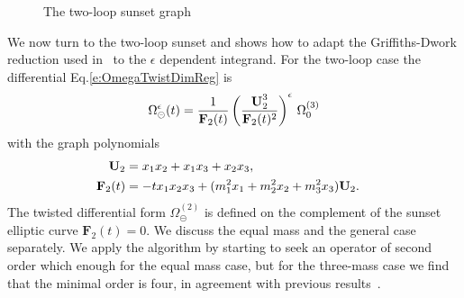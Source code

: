 \documentclass[a4paper,12pt]{article}
\numberwithin{equation}{section}
\numberwithin{figure}{section}
\def\su{\circleddash}
\begin{document}
%
\begin{figure}[ht]
  \centering
  \caption{The two-loop sunset graph}
  \label{fig:sunset2loop}
\end{figure}

We now turn to the two-loop sunset and shows how to adapt the
Griffiths-Dwork reduction used in~\cite{Bloch:2016izu,Lairez:2022zkj} to the $\epsilon$
dependent integrand. For the two-loop case the differential Eq.\eqref{e:OmegaTwistDimReg} is
\begin{equation}\label{e:OmegaSunset}
  \Omega_{\su}^{\epsilon}(t)={1\over
    \textbf{F}_2(t)}\left(\textbf{U}_2^3\over \textbf{F}_2(t)^2\right)^\epsilon  \,\Omega_0^{(3)}
\end{equation}
with the graph polynomials
\begin{align}
 \textbf{U}_2&=x_1x_2+x_1x_3+x_2x_3,\cr
  \textbf{F}_2(t)&=-tx_1x_2x_3 + (m_1^2x_1+m_2^2x_2+m_3^2x_3) \textbf{U}_2.
\end{align}
%
The twisted differential form $\Omega_\su^{(2)}$ is defined on the
complement of the sunset elliptic curve $\mathbf{F}_2(t)=0$.
%
We discuss the equal mass and the general case separately.
We apply the algorithm by starting to seek an operator of second order which enough for the equal mass case, but for the
three-mass case we find that the minimal order is four, in
agreement with previous results~\cite{Caffo:1998du,Remiddi:2013joa,Adams:2015gva}.
\end{document}
